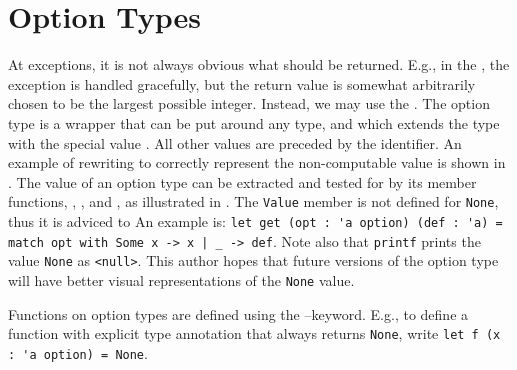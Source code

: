 \documentclass[fsharpnotes.tex]{subfiles}
\begin{document}
\section{Option Types}
\label{sec:optionType}
At exceptions, it is not always obvious what should be returned. E.g., in the , the exception is handled gracefully, but the return value is somewhat arbitrarily chosen to be the largest possible integer. Instead, we may use the . The option type is a wrapper that can be put around any type, and which extends the type with the special value . All other values are preceded by the  identifier. An example of rewriting  to correctly represent the non-computable value is shown in .
%
%
The value of an option type can be extracted and tested for by its member functions, , , and , as illustrated in .
%
%
The \lstinline{Value} member is not defined for \lstinline{None}, thus it is adviced to  An example is: \lstinline{let get (opt : 'a option) (def : 'a) = match opt with Some x -> x | _ -> def}. Note also that \lstinline{printf} prints the value \lstinline{None} as \lstinline{<null>}. This author hopes that future versions of the option type will have better visual representations of the \lstinline{None} value.

Functions on option types are defined using the --keyword. E.g., to define a function with explicit type annotation that always returns \lstinline{None}, write \lstinline{let f (x : 'a option) = None}.
\end{document}

